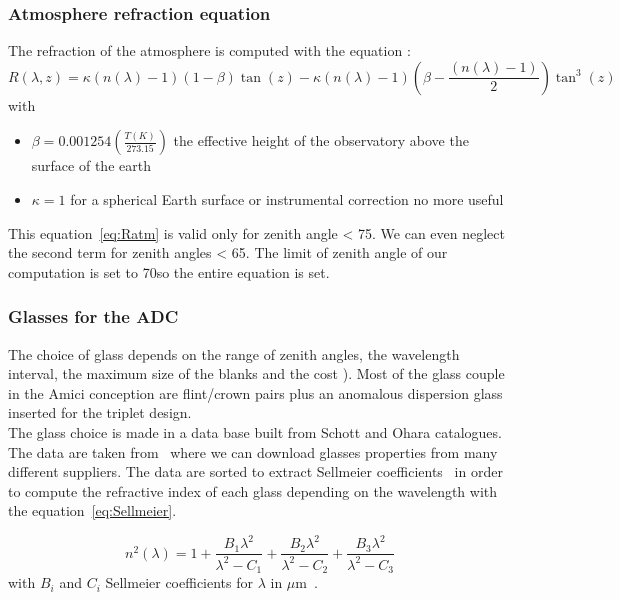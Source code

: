 \subsubsection{Atmosphere refraction equation}
The refraction of the atmosphere is computed with the equation \cite{Stone1996}: 
\begin{equation}
	R(\lambda,z) = \kappa\left(n(\lambda)-1\right)\left(1-\beta\right)\tan(z) - \kappa\left(n(\lambda)-1\right)\left(\beta -\frac{\left(n(\lambda)-1\right)}{2}\right)\tan^3(z)\label{eq:Ratm}
\end{equation}
with 
\begin{itemize}
	\item $\beta = 0.001254\left(\frac{T(K)}{273.15}\right)$ the effective height of the observatory above the surface of the earth \cite{Stone1996}
	\item $\kappa = 1$ for a spherical Earth surface \cite{Stone1996} or instrumental correction no more useful \cite{Stone2002}
\end{itemize} 
This equation~\eqref{eq:Ratm} is valid only for zenith angle < 75\degree. We can even neglect the second term for zenith angles < 65\degree \cite{Tendulkar}. The limit of zenith angle of our computation is set to 70\degree so the entire equation is set.









\subsubsection{Glasses for the ADC}
The choice of glass depends on the range of zenith angles, the wavelength interval, the maximum size of the blanks and the cost \cite{WynneWors1986}). Most of the glass couple in the Amici conception are flint/crown pairs plus an anomalous dispersion glass inserted for the triplet design. \\
The glass choice is made in a data base built from Schott and Ohara catalogues. The data are taken from~\cite{RefIndexInfo} where we can download glasses properties from many different suppliers. The data are sorted to extract Sellmeier coefficients~\cite{SchottSellmeier} in order to compute the refractive index of each glass depending on the wavelength with the equation~\eqref{eq:Sellmeier}.

\begin{equation}
	n^2(\lambda) = 1+ \frac{B_1\lambda^2}{\lambda^2-C_1}+\frac{B_2\lambda^2}{\lambda^2-C_2}+\frac{B_3\lambda^2}{\lambda^2-C_3}\label{eq:Sellmeier}
\end{equation}
with $B_i$ and $C_i$ Sellmeier coefficients for $\lambda$ in $\mu$m~\cite{SchottSellmeier}.\\

